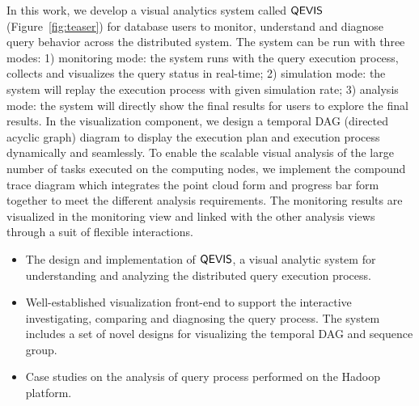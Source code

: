 In this work, we develop a visual analytics system called $\mathsf{QEVIS}$ (Figure~\ref{fig:teaser}) for database users to monitor, understand and diagnose query behavior across the distributed system. The system can be run with three modes: 1) monitoring mode: the system runs with the query execution process, collects and visualizes the query status in real-time; 2) simulation mode: the system will replay the execution process with given simulation rate; 3) analysis mode: the system will directly show the final results for users to explore the final results. In the visualization component, we design a temporal DAG (directed acyclic graph) diagram to display the execution plan and execution process dynamically and seamlessly. To enable the scalable visual analysis of the large number of tasks executed on the computing nodes, we implement the compound trace diagram which integrates the point cloud form and progress bar form together to meet the different analysis requirements. The monitoring results are visualized in the monitoring view and linked with the other analysis views through a suit of flexible interactions. 


\begin{itemize}
\item The design and implementation of $\mathsf{QEVIS}$, a visual analytic system for understanding and analyzing the distributed query execution process.
\item Well-established visualization front-end to support the interactive investigating, comparing and diagnosing the query process. The system includes a set of novel designs for visualizing the temporal DAG and sequence group.
\item Case studies on the analysis of query process performed on the Hadoop platform.
\end{itemize}